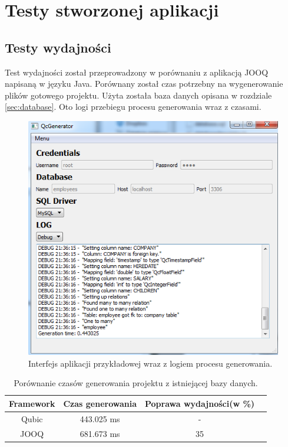\documentclass[12pt]{report}
\let\oldaddcontentsline\addcontentsline
\newcommand{\lstinputcplusplus}[2][]{{%
  \renewcommand{\lstlistingname}{C++ Code}%
  \renewcommand{\addcontentsline}[3]{\oldaddcontentsline{loc}{##2}{##3}}%
}}
\begin{document}
\begin{framed}
\lstinputcplusplus[caption={QcDatabase}]{additional/qcgenerator.cpp}
\end{framed}

\section{Testy stworzonej aplikacji}
\subsection{Testy wydajności}
Test wydajności został przeprowadzony w porównaniu z aplikacją JOOQ napisaną w języku Java. Porównany został czas potrzebny na wygenerowanie plików gotowego projektu. Użyta została baza danych opisana w rozdziale \ref{sec:database}. Oto logi przebiegu procesu generowania wraz z czasami.

\begin{framed}

\end{framed}

\begin{figure}[h]
	\centering
	\includegraphics[width=1.1\textwidth]{images/qubic-gen.png}
	\caption{Interfejs aplikacji przykładowej wraz z logiem procesu generowania.}
\end{figure}
\FloatBarrier

\begin{table}[!ht]
\centering
    \begin{tabular}{cccc}
    \hline
    Framework & Czas generowania & Poprawa wydajności(w \%) \\ \hline
    Qubic & 443.025 ms &  - \\ \hline
    JOOQ & 681.673 ms & 35 \\ \hline
    \end{tabular}
    \caption{Porównanie czasów generowania projektu z istniejącej bazy danych.}
\end{table}
\end{document}
